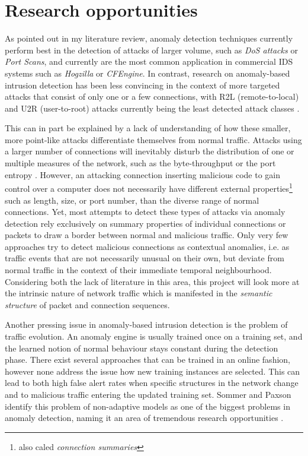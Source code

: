 \documentclass[a4paper,12pt,twoside]{report}
\begin{document}
\section{Research opportunities}

As pointed out in my literature review, anomaly detection techniques currently perform best in the detection of attacks of larger volume, such as \textit{DoS attacks} or \textit{Port Scans}, and currently are the most common application in commercial IDS systems such as \textit{Hogzilla} or \textit{CFEngine}. In contrast, research on anomaly-based intrusion detection has been less convincing in the context of more targeted attacks that consist of only one or a few connections, with R2L (remote-to-local) and U2R (user-to-root) attacks currently being the least detected attack classes \cite{nisioti2018intrusion}. 

This can in part be explained by a lack of understanding of how these smaller, more point-like attacks differentiate themselves from normal traffic. Attacks using a larger number of connections will inevitably disturb the  distribution of one or multiple measures of the network, such as the byte-throughput or the port entropy \cite{lakhina2005mining}. However, an attacking connection inserting malicious code to gain control over a computer does not necessarily have different external properties\footnote{also caled \textit{connection summaries}} such as length, size, or port number, than the diverse range of normal connections. Yet, most attempts to detect these types of attacks via anomaly detection rely exclusively on summary properties of individual connections or packets to draw a border between normal and malicious traffic. Only very few approaches try to detect malicious connections as contextual anomalies, i.e. as traffic events that are not necessarily unusual on their own, but deviate from normal traffic in the context of their immediate temporal neighbourhood. Considering both the lack of literature in this area, this project will look more at the intrinsic nature of network traffic which is manifested in the \textit{semantic structure} of packet and connection sequences. 

Another pressing issue in anomaly-based intrusion detection is the problem of traffic evolution. An anomaly engine is usually trained once on a training set, and the learned notion of normal behaviour stays constant during the detection phase. There exist several approaches that can be trained in an online fashion, however none address the issue how new training instances are selected. This can lead to both high false alert rates when specific structures in the network change and to malicious traffic entering the updated training set. Sommer and Paxson identify this problem of non-adaptive models as one of the biggest problems in anomaly detection, naming it an area of tremendous research opportunities \cite{sommer_outside_2010}.
\end{document}
